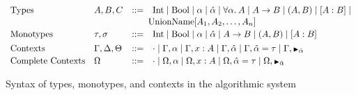 \begin{figure}[h]
  \centering
%
  \[
      \begin{array}{llcl}
      \text{Types} & A, B, C & \bnfas &
            \Inttype \bnfalt \Booltype \bnfalt \alpha \bnfalt \ahat \bnfalt \alltype{\alpha}{A} \bnfalt A \arr B \bnfalt (A, B) \bnfalt [A : B] \bnfalt 
            \\[1pt] &&&\!\!\!
            \Unionname[A_1, A_2, \dots, A_n]
      \\[2pt]
      \text{Monotypes} & \tau,\sigma & \bnfas &
            \Inttype \bnfalt \Booltype \bnfalt \alpha \bnfalt \ahat \bnfalt A \arr B \bnfalt (A, B) \bnfalt [A : B]       
        \\[4pt]
      \text{Contexts} & \Gamma, \Delta, \Theta & \bnfas &
                  \cdot
                  \bnfalt \Gamma, \alpha 
                  \bnfalt \Gamma, x:A
                  \bnfalt \Gamma, \ahat
                  \bnfalt \Gamma, \hypeq{\ahat}{\tau}
                  \bnfalt \Gamma, \MonnierComma{\ahat}
      \\[2pt]
      \text{Complete Contexts}     & \Omega & \bnfas &
                  \cdot
                  \bnfalt    \Omega, \alpha
                  \bnfalt    \Omega, x:A
                  \bnfalt    \Omega, \hypeq{\ahat}{\tau} 
                  \bnfalt    \Omega, \MonnierComma{\ahat}
      \end{array}
  \]
  
  \caption{Syntax of types, monotypes, and contexts in the algorithmic system}
\end{figure}
